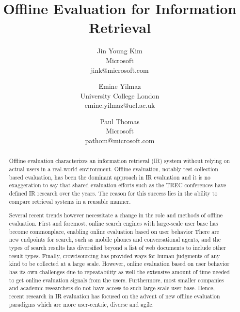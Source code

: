 \documentclass[openany]{now} %
\title{Offline Evaluation for Information Retrieval}
\author{
	Jin Young Kim \\
	Microsoft \\
	jink@microsoft.com
	\and
	Emine Yilmaz \\
	University College London \\
	emine.yilmaz@ucl.ac.uk
	\and
	Paul Thomas \\
	Microsoft \\
	pathom@microsoft.com
}
\newcommand{\authornote}[3]{\marginpar{\tiny\color{#1}#2: #3}{\color{#1}{$\star$}}}
\newcommand{\jin}[1]{\authornote{red}{Jin}{#1}}
\newcommand{\paul}[1]{\authornote{blue}{Paul}{#1}}
\begin{document}

\frontmatter  %

\maketitle

\tableofcontents

\mainmatter

\begin{abstract}
Offline evaluation characterizes an information retrieval (IR) system without relying on actual users in a real-world environment. 
Offline evaluation, notably test collection based evaluation, has been the dominant approach in IR evaluation and it is no exaggeration to say that shared evaluation efforts such as the TREC conferences have defined IR research over the years. 
The reason for this success lies in the ability to compare retrieval systems in a reusable manner.


Several recent trends however necessitate a change in the role and methods of offline evaluation. 
First and foremost, online search engines with large-scale user base has become commonplace, enabling online evaluation based on user behavior There are new endpoints for search, such as mobile phones and conversational agents, and the types of search results has diversified beyond a list of web documents to include other result types. 
Finally, crowdsourcing has provided ways for human judgments of any kind to be collected at a large scale. 
However, online evaluation based on user behavior has its own challenges due to repeatability as well the extensive amount of time needed to get online evaluation signals from the users. 
Furthermore, most smaller companies and academic researchers do not have access to such large scale user base. 
Hence, recent research in IR evaluation has focused on the advent of new  offline evaluation paradigms which are more user-centric, diverse and agile.


\end{abstract}
\end{document}
